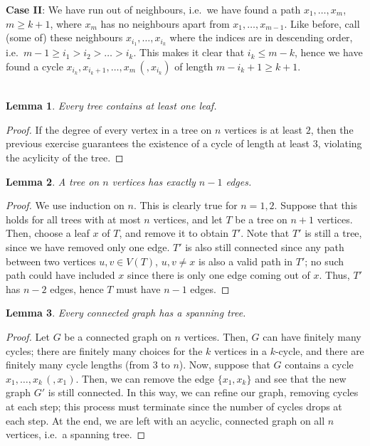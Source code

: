 \documentclass[10pt]{article}
\newtheorem{lemma}{Lemma}
\begin{document}
    \textbf{Case II}: We have run out of neighbours, i.e.\ we have found a path
    $x_1, \dots, x_m$, $m \geq k + 1$, where $x_m$ has no neighbours apart from
    $x_1, \dots, x_{m - 1}$. Like before, call (some of) these neighbours $x_{i_1}, \dots,
    x_{i_k}$ where the indices are in descending order, i.e.\ $m - 1 \geq i_1 > i_2 >
    \dots > i_k$. This makes it clear that $i_k \leq m - k$, hence we have found a
    cycle $x_{i_k}, x_{i_k + 1}, \dots, x_m\, (, x_{i_k})$ of length $m - i_k + 1
    \geq k + 1$.
    \\~\\
    
    \begin{lemma}
        Every tree contains at least one leaf.
    \end{lemma}
    \begin{proof}
        If the degree of every vertex in a tree on $n$ vertices is at least $2$, then
        the previous exercise guarantees the existence of a cycle of length at least
        $3$, violating the acylicity of the tree.
    \end{proof}
    

    \begin{lemma}
        A tree on $n$ vertices has exactly $n - 1$ edges.
    \end{lemma}
    \begin{proof}
        We use induction on $n$. This is clearly true for $n = 1, 2$. Suppose that
        this holds for all trees with at most $n$ vertices, and let $T$ be a tree on
        $n + 1$ vertices. Then, choose a leaf $x$ of $T$, and remove it to obtain
        $T'$. Note that $T'$ is still a tree, since we have removed only one edge.
        $T'$ is also still connected since any path between two vertices $u, v \in
        V(T)$, $u, v \neq x$ is also a valid path in $T'$; no such path could have
        included $x$ since there is only one edge coming out of $x$. Thus, $T'$ has
        $n - 2$ edges, hence $T$ must have $n - 1$ edges.
    \end{proof}

    \begin{lemma}
        Every connected graph has a spanning tree.
    \end{lemma}
    \begin{proof}
        Let $G$ be a connected graph on $n$ vertices. Then, $G$ can have finitely
        many cycles; there are finitely many choices for the $k$ vertices in a
        $k$-cycle, and there are finitely many cycle lengths (from $3$ to $n$). Now,
        suppose that $G$ contains a cycle $x_1, \dots, x_k\,(, x_1)$. Then, we can
        remove the edge $\{x_1, x_k\}$ and see that the new graph $G'$ is still
        connected. In this way, we can refine our graph, removing cycles at each
        step; this process must terminate since the number of cycles drops at each
        step. At the end, we are left with an acyclic, connected graph on all $n$
        vertices, i.e.\ a spanning tree.
    \end{proof}
    
\end{document}
